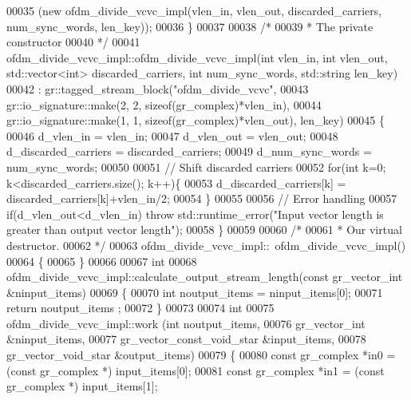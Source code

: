\begin{DoxyCode}
00035         (\textcolor{keyword}{new} ofdm_divide_vcvc_impl(vlen\_in, vlen\_out, discarded\_carriers, num\_sync\_words, len\_key));
00036     \}
00037 
00038     \textcolor{comment}{/*}
00039 \textcolor{comment}{     * The private constructor}
00040 \textcolor{comment}{     */}
00041     ofdm_divide_vcvc_impl::ofdm_divide_vcvc_impl(\textcolor{keywordtype}{int} vlen\_in, \textcolor{keywordtype}{int} vlen\_out, std::vector<int> 
      discarded\_carriers, \textcolor{keywordtype}{int} num\_sync\_words, std::string len\_key)
00042       : gr::tagged\_stream\_block(\textcolor{stringliteral}{"ofdm\_divide\_vcvc"},
00043               gr::io\_signature::make(2, 2, sizeof(gr\_complex)*vlen\_in),
00044               gr::io\_signature::make(1, 1, sizeof(gr\_complex)*vlen\_out), len\_key)
00045     \{
00046         d_vlen_in = vlen\_in;
00047         d_vlen_out = vlen\_out;
00048         d_discarded_carriers = discarded\_carriers;
00049         d_num_sync_words = num\_sync\_words;
00050         
00051         \textcolor{comment}{// Shift discarded carriers}
00052         \textcolor{keywordflow}{for}(\textcolor{keywordtype}{int} k=0; k<discarded\_carriers.size(); k++)\{
00053             d_discarded_carriers[k] = discarded\_carriers[k]+vlen\_in/2;
00054         \}
00055         
00056         \textcolor{comment}{// Error handling}
00057         \textcolor{keywordflow}{if}(d_vlen_out<d_vlen_in) \textcolor{keywordflow}{throw} std::runtime\_error(\textcolor{stringliteral}{"Input vector length is greater than output
       vector length"});
00058     \}
00059 
00060     \textcolor{comment}{/*}
00061 \textcolor{comment}{     * Our virtual destructor.}
00062 \textcolor{comment}{     */}
00063     ofdm_divide_vcvc_impl::~ofdm_divide_vcvc_impl()
00064     \{
00065     \}
00066 
00067     \textcolor{keywordtype}{int}
00068     ofdm_divide_vcvc_impl::calculate_output_stream_length(\textcolor{keyword}{const} gr\_vector\_int &ninput\_items)
00069     \{
00070       \textcolor{keywordtype}{int} noutput\_items = ninput\_items[0];
00071       \textcolor{keywordflow}{return} noutput\_items ;
00072     \}
00073 
00074     \textcolor{keywordtype}{int}
00075     ofdm_divide_vcvc_impl::work (\textcolor{keywordtype}{int} noutput\_items,
00076                        gr\_vector\_int &ninput\_items,
00077                        gr\_vector\_const\_void\_star &input\_items,
00078                        gr\_vector\_void\_star &output\_items)
00079     \{
00080         \textcolor{keyword}{const} gr\_complex *in0 = (\textcolor{keyword}{const} gr\_complex *) input\_items[0];
00081         \textcolor{keyword}{const} gr\_complex *in1 = (\textcolor{keyword}{const} gr\_complex *) input\_items[1];

\end{DoxyCode}
